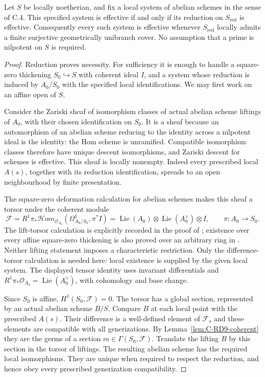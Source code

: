 \begin{theorem}
\label{thm:C-RD9}
Let $S$ be locally noetherian, and fix a local system of abelian
schemes in the sense of C.4. This specified system is effective if
and only if its reduction on $S_{\mathrm{red}}$ is effective.
Consequently every such system is effective whenever
$S_{\mathrm{red}}$ locally admits a finite surjective geometrically
unibranch cover. No assumption that a prime is nilpotent on $S$ is
required.
\end{theorem}
\begin{proof}
Reduction proves necessity. For sufficiency it is enough to handle a
square-zero thickening $S_0\hookrightarrow S$ with coherent ideal
$I$, and a system whose reduction is induced by $A_0/S_0$ with the
specified local identifications. We may first work on an affine open
of $S$.

Consider the Zariski sheaf of isomorphism classes of actual abelian
scheme liftings of $A_0$, with their chosen identification on $S_0$.
It is a sheaf because an automorphism of an abelian scheme reducing
to the identity across a nilpotent ideal is the identity: the Hom
scheme is unramified. Compatible isomorphism classes therefore have
unique descent isomorphisms, and Zariski descent for schemes is
effective. This sheaf is locally nonempty. Indeed every prescribed
local $A(s)$, together with its reduction identification, spreads to
an open neighbourhood by finite presentation.

The square-zero deformation calculation for abelian schemes makes
this sheaf a torsor under the coherent module
\[
 \mathcal F
 =R^1\pi_*\mathcal Hom_{\mathcal O_{A_0}}
       (\Omega^1_{A_0/S_0},\pi^*I)
 =\operatorname{Lie}(A_0)\otimes
   \operatorname{Lie}(A_0^\vee)\otimes I,
 \qquad \pi:A_0\longrightarrow S_0.
\]
The lift-torsor calculation is explicitly recorded in the proof of
\cite[Lemma~24, p.590]{VasiuZink2010Purity}; existence over every affine square-zero thickening is also
proved over an arbitrary ring in
\cite[Chapter~IV, Lemma~2.8.1, pp.148--149]{Messing1972}. Neither
lifting statement imposes a characteristic restriction. Only
the difference-torsor calculation is needed here: local existence is
supplied by the given local system. The displayed tensor identity
uses invariant differentials and
$R^1\pi_*\mathcal O_{A_0}=\operatorname{Lie}(A_0^\vee)$, with
cohomology and base change.

Since $S_0$ is affine, $H^1(S_0,\mathcal F)=0$. The torsor has a
global section, represented by an actual abelian scheme $B/S$.
Compare $B$ at each local point with the prescribed $A(s)$. Their
difference is a well-defined element of $\mathcal F_s$ and these
elements are compatible with all generizations. By
Lemma~\ref{lem:C-RD9-coherent} they are the germs of a section
$m\in\Gamma(S_0,\mathcal F)$. Translate the lifting $B$ by this
section in the torsor of liftings. The resulting abelian scheme has
the required local isomorphisms. They are unique when required to
respect the reduction, and hence obey every prescribed generization
compatibility.


\end{proof}
